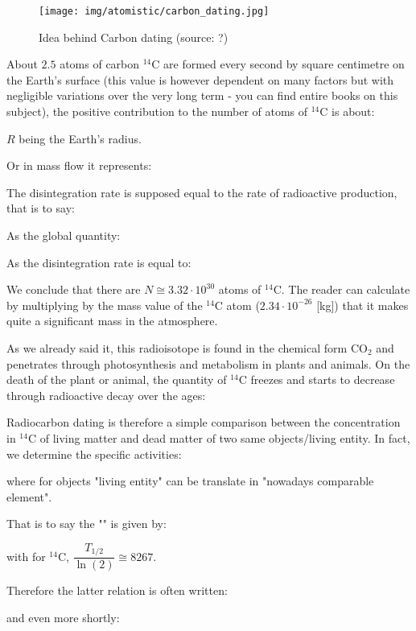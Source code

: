 	\begin{figure}[H]
		\begin{center}
		\texttt{[image: img/atomistic/carbon\_dating.jpg]}
		\end{center}	
		\caption[Idea behind Carbon dating]{Idea behind Carbon dating (source: ?)}
	\end{figure}
	
	About $2.5$ atoms of carbon $^{14}\mathrm{C}$ are formed every second by square centimetre on the Earth's surface (this value is however dependent on many factors but with negligible variations over the very long term - you can find entire books on this subject), the positive contribution to the number of atoms of  $^{14}\mathrm{C}$ is about:
	
	$R$ being the Earth's radius.
	
	Or in mass flow it represents:
	
	The disintegration rate is supposed equal to the rate of radioactive production, that is to say:
	
	As the global quantity:
	
	As the disintegration rate is equal to:
	
	We conclude that there are $N\cong 3.32\cdot 10^{30}$ atoms of $^{14}\mathrm{C}$. The reader can calculate by multiplying by the mass value of the  $^{14}\mathrm{C}$ atom ($2.34\cdot 10^{-26}$ [kg]) that it makes quite a significant mass in the atmosphere.
	
	As we already said it, this radioisotope is found in the chemical form $\mathrm{CO}_2$ and penetrates through photosynthesis and metabolism in plants and animals. On the death of the plant or animal, the quantity of $^{14}\mathrm{C}$ freezes and starts to decrease through radioactive decay over the ages:
	
	Radiocarbon dating is therefore a simple comparison between the concentration in  $^{14}\mathrm{C}$ of living matter and dead matter of two same objects/living entity. In fact, we determine the specific activities:
	
	where for objects "living entity" can be translate in "nowadays comparable element".
	
	That is to say the "" is given by:
	
	with for $^{14}\mathrm{C}$, $\dfrac{T_{1/2}}{\ln(2)}\cong 8267$.
	
	Therefore the latter relation is often written:
	
	and even more shortly:
	
